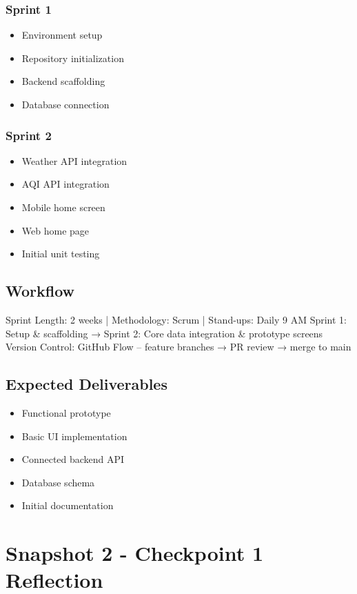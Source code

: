 \documentclass[12pt]{article}
\begin{document}
\subsubsection{Sprint 1}
\begin{itemize}
    \item Environment setup
    \item Repository initialization
    \item Backend scaffolding
    \item Database connection
\end{itemize}

\subsubsection{Sprint 2}
\begin{itemize}
    \item Weather API integration
    \item AQI API integration
    \item Mobile home screen
    \item Web home page
    \item Initial unit testing
\end{itemize}

\subsection{Workflow}
Sprint Length: 2 weeks  |  Methodology: Scrum  |  Stand-ups: Daily 9 AM
Sprint 1: Setup \& scaffolding → Sprint 2: Core data integration \& prototype screens
Version Control: GitHub Flow – feature branches → PR review → merge to main



\subsection{Expected Deliverables}

\begin{itemize}
    \item Functional prototype
    \item Basic UI implementation
    \item Connected backend API
    \item Database schema
    \item Initial documentation
\end{itemize}
\newpage

\section{Snapshot 2 - Checkpoint 1 Reflection}
\end{document}
